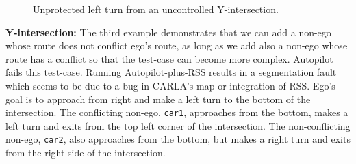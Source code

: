 \begin{figure}[ht]
\begin{minipage}[t]{.499\linewidth}
  \end{minipage}%
  \caption{Unprotected left turn from an uncontrolled Y-intersection.}\label{fig:Y-intersection}%
\end{figure}%


\textbf{Y-intersection:} The third example demonstrates that we can add a non-ego whose route does not conflict ego's route, as long as we add also a non-ego whose route has a conflict so that the test-case can become more complex.
%
Autopilot fails this test-case.
%
Running Autopilot-plus-RSS results in a segmentation fault which seems to be due to a bug in CARLA's map or integration of RSS.
%
Ego's goal is to approach from right and make a left turn to the bottom of the intersection.
%
The conflicting non-ego, \verb|car1|, approaches from the bottom, makes a left turn and exits from the top left corner of the intersection.
%
The non-conflicting non-ego, \verb|car2|, also approaches from the bottom, but makes a right turn and exits from the right side of the intersection.

